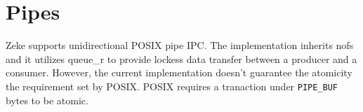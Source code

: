 \chapter{Pipes}

Zeke supports unidirectional \ac{POSIX} pipe \ac{IPC}. The implementation
inherits nofs and it utilizes queue_r to provide lockess data transfer
between a producer and a consumer. However, the current implementation
doesn't guarantee the atomicity the requirement set by \ac{POSIX}. POSIX
requires a tranaction under \verb+PIPE_BUF+ bytes to be atomic.
